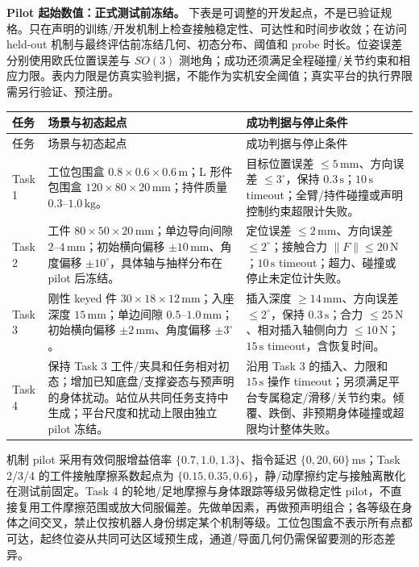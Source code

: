 \documentclass[11pt]{article}
\begin{document}
\textbf{Pilot 起始数值：正式测试前冻结。} 下表是可调整的开发起点，不是已验证规格。只在声明的训练/开发机制上检查接触稳定性、可达性和时间步收敛；在访问 held-out 机制与最终评估前冻结几何、初态分布、阈值和 probe 时长。位姿误差分别使用欧氏位置误差与 $SO(3)$ 测地角；成功还须满足全程碰撞/关节约束和相应力限。表内力限是仿真实验判据，不能作为实机安全阈值；真实平台的执行界限需另行验证、预注册。
\small
\begin{longtable}{L{1.0cm}L{5.5cm}L{5.5cm}}
\toprule
任务 & 场景与初态起点 & 成功判据与停止条件\\\midrule\endfirsthead
\toprule 任务 & 场景与初态起点 & 成功判据与停止条件\\\midrule\endhead
Task 1 & 工位包围盒 $0.8\times0.6\times0.6\,\mathrm{m}$；L 形件包围盒 $120\times80\times20\,\mathrm{mm}$；持件质量 $0.3$--$1.0\,\mathrm{kg}$。 & 目标位置误差 $\le5\,\mathrm{mm}$、方向误差 $\le3^\circ$，保持 $0.3\,\mathrm{s}$；$10\,\mathrm{s}$ timeout；全臂/持件碰撞或声明控制约束超限计失败。\\
Task 2 & 工件 $80\times50\times20\,\mathrm{mm}$；单边导向间隙 $2$--$4\,\mathrm{mm}$；初始横向偏移 $\pm10\,\mathrm{mm}$、角度偏移 $\pm10^\circ$，具体轴与抽样分布在 pilot 后冻结。 & 定位误差 $\le2\,\mathrm{mm}$、方向误差 $\le2^\circ$；接触合力 $\|F\|\le20\,\mathrm{N}$；$10\,\mathrm{s}$ timeout；超力、碰撞或停止未定位计失败。\\
Task 3 & 刚性 keyed 件 $30\times18\times12\,\mathrm{mm}$；入座深度 $15\,\mathrm{mm}$；单边间隙 $0.5$--$1.0\,\mathrm{mm}$；初始横向偏移 $\pm2\,\mathrm{mm}$、角度偏移 $\pm3^\circ$。 & 插入深度 $\ge14\,\mathrm{mm}$、方向误差 $\le2^\circ$，保持 $0.3\,\mathrm{s}$；合力 $\le25\,\mathrm{N}$、相对插入轴侧向力 $\le10\,\mathrm{N}$；$15\,\mathrm{s}$ timeout，含恢复时间。\\
Task 4 & 保持 Task 3 工件/夹具和任务相对初态；增加已知底盘/支撑姿态与预声明的身体扰动。站位从共同任务支持中生成；平台尺度和扰动上限由独立 pilot 冻结。 & 沿用 Task 3 的插入、力限和 $15\,\mathrm{s}$ 操作 timeout；另须满足平台专属稳定/滑移/关节约束。倾覆、跌倒、非预期身体碰撞或超限均计整体失败。\\
\bottomrule
\end{longtable}
\normalsize
机制 pilot 采用有效伺服增益倍率 $\{0.7,1.0,1.3\}$、指令延迟 $\{0,20,60\}\,\mathrm{ms}$；Task 2/3/4 的工件接触摩擦系数起点为 $\{0.15,0.35,0.6\}$，静/动摩擦约定与接触离散化在测试前固定。Task 4 的轮地/足地摩擦与身体跟踪等级另做稳定性 pilot，不直接复用工件摩擦范围或放大伺服偏差。先做单因素，再做预声明组合；各等级在身体之间交叉，禁止仅按机器人身份绑定某个机制等级。工位包围盒不表示所有点都可达，起终位姿从共同可达区域预生成，通道/导面几何仍需保留要测的形态差异。
\end{document}
